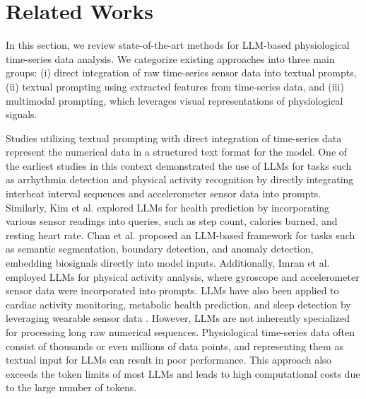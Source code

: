 \section{Related Works}
In this section, we review state-of-the-art methods for LLM-based physiological time-series data analysis. We categorize existing approaches into three main groups: (i) direct integration of raw time-series sensor data into textual prompts, (ii) textual prompting using extracted features from time-series data, and (iii) multimodal prompting, which leverages visual representations of physiological signals. 

Studies utilizing textual prompting with direct integration of time-series data represent the numerical data in a structured text format for the model. One of the earliest studies in this context \cite{liu2023large} demonstrated the use of LLMs for tasks such as arrhythmia detection and physical activity recognition by directly integrating interbeat interval sequences and accelerometer sensor data into prompts. Similarly, Kim et al. \cite{kim2024health} explored LLMs for health prediction by incorporating various sensor readings into queries, such as step count, calories burned, and resting heart rate. Chan et al. \cite{chan2024medtsllm} proposed an LLM-based framework for tasks such as semantic segmentation, boundary detection, and anomaly detection, embedding biosignals directly into model inputs. Additionally, Imran et al. \cite{imran2024llasa} employed LLMs for physical activity analysis, where gyroscope and accelerometer sensor data were incorporated into prompts. LLMs have also been applied to cardiac activity monitoring, metabolic health prediction, and sleep detection by leveraging wearable sensor data  \cite{bohi2024large}. However, LLMs are not inherently specialized for processing long raw numerical sequences. Physiological time-series data often consist of thousands or even millions of data points, and representing them as textual input for LLMs can result in poor performance. This approach also exceeds the token limits of most LLMs and leads to high computational costs due to the large number of tokens.

